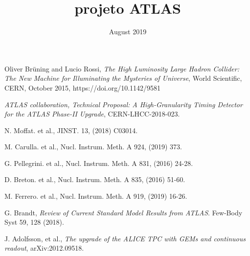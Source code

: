 \documentclass{report}
\title{projeto ATLAS}
\date{August 2019}
\begin{document}





\tableofcontents



%


\newpage

\newpage
\begin{thebibliography}{9}

 Oliver Brüning and Lucio Rossi, \textit{The High Luminosity Large Hadron Collider: The New Machine for Illuminating the Mysteries of Universe}, World Scientific, CERN, October 2015,  https://doi.org/10.1142/9581

 \textit{ATLAS collaboration, Technical Proposal: A High-Granularity Timing Detector for the ATLAS Phase-II Upgrade}, CERN-LHCC-2018-023.

 N. Moffat. et al., JINST. 13, (2018) C03014.

 M. Carulla. et al., Nucl. Instrum. Meth. A 924, (2019) 373. 

%
 G. Pellegrini. et al., Nucl. Instrum. Meth. A 831, (2016) 24-28.

 D. Breton. et al., Nucl. Instrum. Meth. A 835, (2016) 51-60.

 M. Ferrero. et al., Nucl. Instrum. Meth. A 919, (2019) 16-26.
%

 G. Brandt, \textit{Review of Current Standard Model Results from ATLAS}. Few-Body Syst 59, 128 (2018). 





 J. Adolfsson, et al., \textit{The upgrade of the ALICE TPC with GEMs and continuous readout}, arXiv:2012.09518.


\end{thebibliography}
\end{document}
